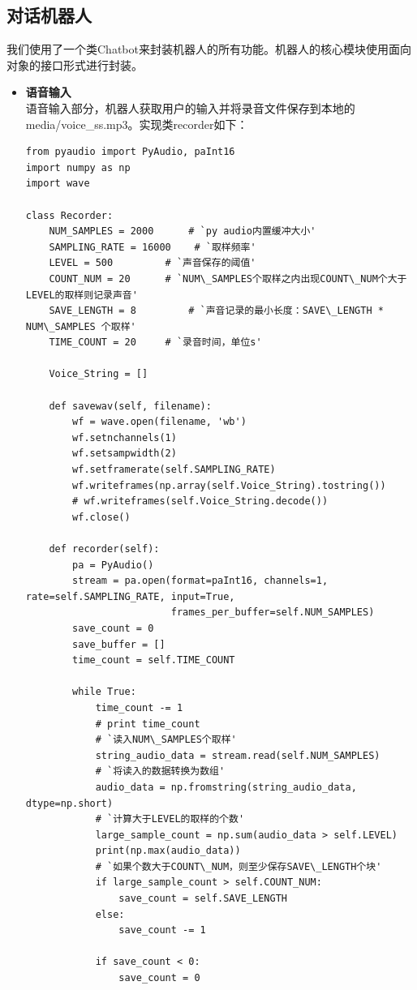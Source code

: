 \documentclass[logo,reportComp]{thesis}
\begin{document}
\subsection{对话机器人}
我们使用了一个类Chatbot来封装机器人的所有功能。机器人的核心模块使用面向对象的接口形式进行封装。
\begin{itemize}
    \item \textbf{语音输入}\\
    语音输入部分，机器人获取用户的输入并将录音文件保存到本地的media/voice\_ss.mp3。实现类recorder如下：
\begin{lstlisting}
from pyaudio import PyAudio, paInt16
import numpy as np
import wave

class Recorder:
    NUM_SAMPLES = 2000      # `py audio内置缓冲大小'
    SAMPLING_RATE = 16000    # `取样频率'
    LEVEL = 500         # `声音保存的阈值'
    COUNT_NUM = 20      # `NUM\_SAMPLES个取样之内出现COUNT\_NUM个大于LEVEL的取样则记录声音'
    SAVE_LENGTH = 8         # `声音记录的最小长度：SAVE\_LENGTH * NUM\_SAMPLES 个取样'
    TIME_COUNT = 20     # `录音时间，单位s'

    Voice_String = []

    def savewav(self, filename):
        wf = wave.open(filename, 'wb')
        wf.setnchannels(1)
        wf.setsampwidth(2)
        wf.setframerate(self.SAMPLING_RATE)
        wf.writeframes(np.array(self.Voice_String).tostring())
        # wf.writeframes(self.Voice_String.decode())
        wf.close()

    def recorder(self):
        pa = PyAudio()
        stream = pa.open(format=paInt16, channels=1, rate=self.SAMPLING_RATE, input=True,
                         frames_per_buffer=self.NUM_SAMPLES)
        save_count = 0
        save_buffer = []
        time_count = self.TIME_COUNT

        while True:
            time_count -= 1
            # print time_count
            # `读入NUM\_SAMPLES个取样'
            string_audio_data = stream.read(self.NUM_SAMPLES)
            # `将读入的数据转换为数组'
            audio_data = np.fromstring(string_audio_data, dtype=np.short)
            # `计算大于LEVEL的取样的个数'
            large_sample_count = np.sum(audio_data > self.LEVEL)
            print(np.max(audio_data))
            # `如果个数大于COUNT\_NUM，则至少保存SAVE\_LENGTH个块'
            if large_sample_count > self.COUNT_NUM:
                save_count = self.SAVE_LENGTH
            else:
                save_count -= 1

            if save_count < 0:
                save_count = 0


\end{lstlisting}
\end{itemize}
\end{document}
